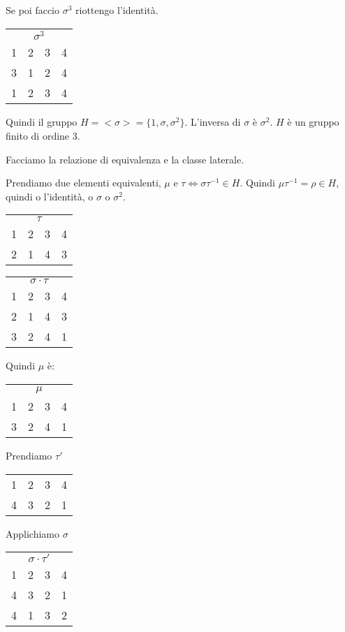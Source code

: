 Se poi faccio $\sigma^{3}$ riottengo l'identit\`a.

\begin{tabular}{cccc}
\multicolumn{4}{c}{$\sigma^{3}$} \\
1 & 2 & 3 & 4 \\
3 & 1 & 2 & 4 \\
1 & 2 & 3 & 4 
\end{tabular}

Quindi il gruppo $H = < \sigma > = \{ 1 , \sigma, \sigma^{2} \}$. L'inversa di $\sigma$ \`e $\sigma^{2}$. $H$ \`e un gruppo finito di ordine 3.

Facciamo la relazione di equivalenza e la classe laterale.

Prendiamo due elementi equivalenti, $\mu$  e $\tau \Leftrightarrow \sigma \tau^{-1} \in H$. Quindi $\mu \tau^{-1} = \rho \in H$, quindi o l'identit\`a, o $\sigma$ o $\sigma^{2}$.

\begin{tabular}{cccc}
\multicolumn{4}{c}{$\tau$} \\
1 & 2 & 3 & 4 \\
2 & 1 & 4 & 3
\end{tabular}

\begin{tabular}{cccc}
\multicolumn{4}{c}{$\sigma \cdot \tau$} \\
1 & 2 & 3 & 4 \\
2 & 1 & 4 & 3 \\
3 & 2 & 4 & 1
\end{tabular}

Quindi $\mu$ \`e:

\begin{tabular}{cccc}
\multicolumn{4}{c}{$\mu$} \\
1 & 2 & 3 & 4 \\
3 & 2 & 4 & 1
\end{tabular}

Prendiamo $\tau'$

\begin{tabular}{cccc}
1 & 2 & 3 & 4 \\
4 & 3 & 2 & 1
\end{tabular}

Applichiamo $\sigma$

\begin{tabular}{cccc}
\multicolumn{4}{c}{$\sigma \cdot \tau'$} \\
1 & 2 & 3 & 4 \\
4 & 3 & 2 & 1 \\
4 & 1 & 3 & 2
\end{tabular}

